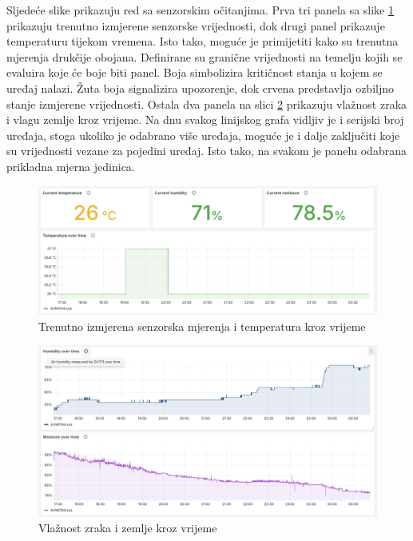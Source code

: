Sljedeće slike prikazuju red sa senzorskim očitanjima. Prva tri panela sa slike \ref{fig:grafana_data_1} prikazuju trenutno izmjerene senzorske vrijednosti, dok drugi panel prikazuje temperaturu tijekom vremena. Isto tako, moguće je primijetiti kako su trenutna mjerenja drukčije obojana. Definirane su granične vrijednosti  na temelju kojih se evaluira koje će boje biti panel. Boja simbolizira kritičnost stanja u kojem se uređaj nalazi. Žuta boja signalizira upozorenje, dok crvena predstavlja ozbiljno stanje izmjerene vrijednosti. Ostala dva panela na slici \ref{fig:grafana_data_2} prikazuju vlažnost zraka i vlagu zemlje kroz vrijeme. Na dnu svakog linijskog grafa vidljiv je i serijski broj uređaja, stoga ukoliko je odabrano više uređaja, moguće je i dalje zaključiti koje su vrijednosti vezane za pojedini uređaj. Isto tako, na svakom je panelu odabrana prikladna mjerna jedinica. 

\begin{figure}[ht]
	\centering
	\includegraphics[scale=0.4]{imgs/grafana_data_1}
	\caption{Trenutno izmjerena senzorska mjerenja i temperatura kroz vrijeme}
	\label{fig:grafana_data_1}
\end{figure}

\begin{figure}[ht]
	\centering
	\includegraphics[scale=0.4]{imgs/grafana_data_2}
	\caption{Vlažnost zraka i zemlje kroz vrijeme}
	\label{fig:grafana_data_2}
\end{figure}

